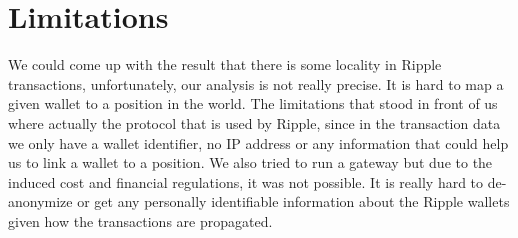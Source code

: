 \section{Limitations}
We could come up with the result that there is some locality in Ripple transactions, unfortunately, our analysis is not really precise. It is hard to map a given wallet to a position in the world.
The limitations that stood in front of us where actually the protocol that is used by Ripple, since in the transaction data we only have a wallet identifier, no IP address or any information that could help us to link a wallet to a position. 
We also tried to run a gateway but due to the induced cost and financial regulations, it was not possible.
It is really hard to de-anonymize or get any personally identifiable information about the Ripple wallets given how the transactions are propagated.